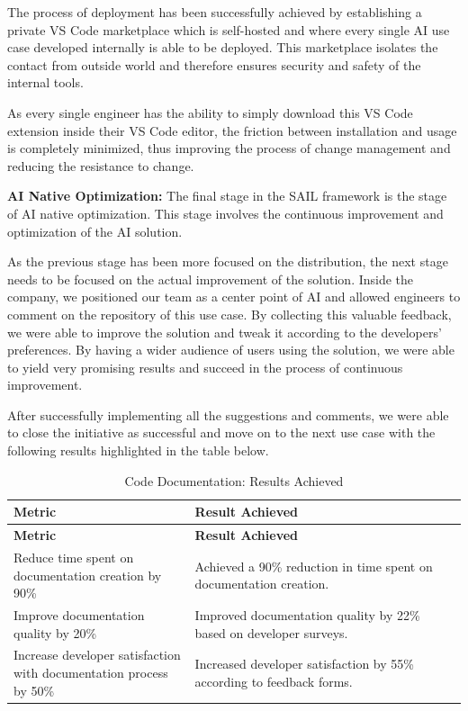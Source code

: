 \documentclass[]{imc-inf}
\begin{document}
The process of deployment has been successfully achieved by establishing a private VS Code marketplace which is self-hosted and where every single AI use case developed internally is able to be deployed. This marketplace isolates the contact from outside world and therefore ensures security and safety of the internal tools. 

As every single engineer has the ability to simply download this VS Code extension inside their VS Code editor, the friction between installation and usage is completely minimized, thus improving the process of change management and reducing the resistance to change.

\textbf{AI Native Optimization:}
The final stage in the SAIL framework is the stage of AI native optimization. This stage involves the continuous improvement and optimization of the AI solution.

As the previous stage has been more focused on the distribution, the next stage needs to be focused on the actual improvement of the solution. Inside the company, we positioned our team as a center point of AI and allowed engineers to comment on the repository of this use case. By collecting this valuable feedback, we were able to improve the solution and tweak it according to the developers' preferences. By having a wider audience of users using the solution, we were able to yield very promising results and succeed in the process of continuous improvement.

After successfully implementing all the suggestions and comments, we were able to close the initiative as successful and move on to the next use case with the following results highlighted in the table below.

\begin{longtable}{|p{0.4\linewidth}|p{0.6\linewidth}|}
	\hline
	\textbf{Metric} & \textbf{Result Achieved} \\
	\hline
	\endfirsthead
	\hline
	\textbf{Metric} & \textbf{Result Achieved} \\
	\hline
	\endhead
	\hline
	\caption{Code Documentation: Results Achieved}
	\label{tab:doc_gen_results}
	\endlastfoot
	
	Reduce time spent on documentation creation by 90\% &
	Achieved a 90\% reduction in time spent on documentation creation. \\
	\hline
	
	Improve documentation quality by 20\% &
	Improved documentation quality by 22\% based on developer surveys.\\
	\hline
	
	Increase developer satisfaction with documentation process by 50\% &
	Increased developer satisfaction by 55\% according to feedback forms. \\
	\hline

\end{longtable}
\end{document}
